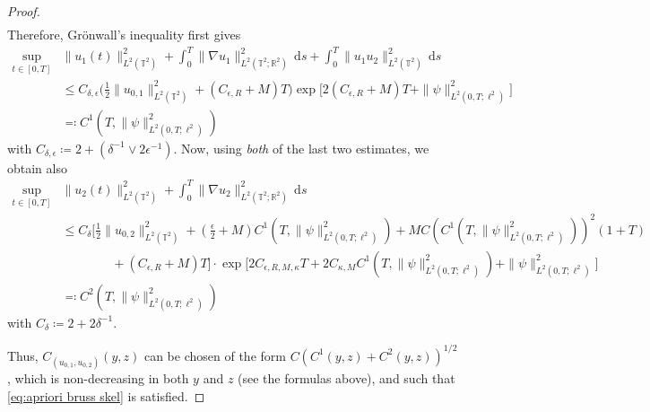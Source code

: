 \documentclass{amsart}
\newcommand{\dd}{\,\mathrm{d}}
\newcommand{\<}{\langle}
\newcommand{\?}{\rangle}
\newcommand{\ceqq}{\coloneqq}
\newcommand{\eqqc}{\eqqcolon}
\newcommand{\Tor}{\mathbb{T}}
\renewcommand{\Tor}{\mathbb{T}^2}
\theoremstyle{plain}
\theoremstyle{remark}
\theoremstyle{plain}
\numberwithin{equation}{section}
\def\R{{\mathbb R}}
\begin{document}
\begin{proof}
\begin{align*}
\end{align*} 
Therefore, Gr\"onwall's inequality first gives  
\begin{align*} 
\sup_{t\in[0,T]}&\|u_1(t)\|_{L^2(\Tor)}^2  +\int_0^T \|\nabla u_1\|_{L^2(\Tor;\R^2)}^2\dd s+\int_0^T\| u_1 u_2\|_{L^2(\Tor)}^2 \dd s \\
&\leq C_{\delta,\epsilon}\big(\tfrac12\|u_{0,1}\|_{L^2(\Tor)}^2+(C_{\epsilon,R}+M)T\big)\exp\big[2(C_{\epsilon,R}+M)T+ \|\psi\|_{L^2(0,T;\ell^2)}^2\big] \\
&\eqqc C^{1}(T,\|\psi\|_{L^2(0,T;\ell^2)}^2)
\end{align*} 
with $C_{\delta,\epsilon}\ceqq 2 +(\delta^{-1}\vee 2\epsilon^{-1})$. Now, using \emph{both} of the last two estimates, we obtain also   
\begin{align*} 
\sup_{t\in[0,T]}&\|u_2(t)\|_{L^2(\Tor)}^2  +\int_0^T\|\nabla u_2\|_{L^2(\Tor;\R^2)}^2 \dd s\\
&\leq C_{\delta}\big[\tfrac12\|u_{0,2}\|_{L^2(\Tor)}^2+ (\tfrac{\epsilon}{2}+M)C^{1}(T,\|\psi\|_{L^2(0,T;\ell^2)}^2) + MC (C^{1}(T,\|\psi\|_{L^2(0,T;\ell^2)}^2))^2(1+T)\\
&\qquad \qquad
+(C_{\epsilon,R}+M)T\big]\cdot\exp\big[2C_{\epsilon,{R},M,\kappa}T+2C_{\kappa,M}C^{1}(T,\|\psi\|_{L^2(0,T;\ell^2)}^2)+ \|\psi\|_{L^2(0,T;\ell^2)}^2\big]\\
&\eqqc C^{2}(T,\|\psi\|_{L^2(0,T;\ell^2)}^2)  
\end{align*}
with $C_{\delta}\ceqq 2+ 2\delta^{-1}$. 

Thus,  $C_{(u_{0,1},u_{0,2})}(y,z)$ can be chosen of the form $C(C^1(y,z)+C^2(y,z))^{1/2}$, which is non-decreasing in both $y$ and $z$ (see the formulas above), and such that \eqref{eq:apriori bruss skel} is satisfied.  
 \end{proof}
\end{document}
